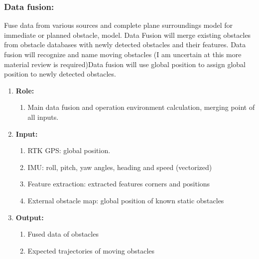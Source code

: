 \subsubsection{Data fusion:}
Fuse data from various sources and complete plane surroundings model for immediate or planned obstacle, model. Data Fusion will merge existing obstacles from obstacle databases with newly detected obstacles and their features. Data fusion will recognize and name moving obstacles (I am uncertain at this more material review is required)Data fusion will use global position to assign global position to newly detected obstacles.
	\begin{enumerate}[]
	\item \textbf{Role:}
		\begin{enumerate}[]
		\item Main data fusion and operation environment calculation, merging point of all inputs.
		\end{enumerate}
	\item \textbf{Input:}
		\begin{enumerate}[1.]
		\item RTK GPS: global position.
		\item IMU: roll, pitch, yaw angles, heading and speed (vectorized)
		\item Feature extraction: extracted features corners and positions
		\item External obstacle map:  global position of known static obstacles
		\end{enumerate}
	\item \textbf{Output:}
		\begin{enumerate}[1.]
		\item Fused data of obstacles
		\item Expected trajectories of moving obstacles
		\end{enumerate}
	\end{enumerate}
	

